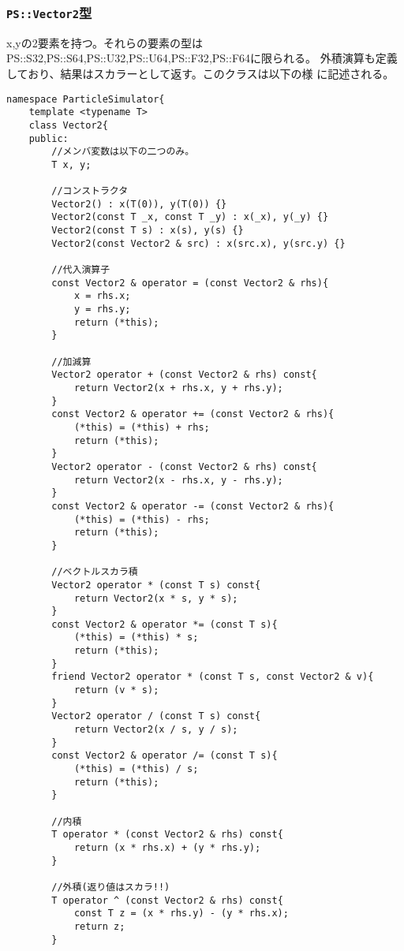 \subsubsection{{\tt PS::Vector2}型} 

x,yの2要素を持つ。それらの要素の型は
{PS::S32},{PS::S64},{PS::U32},{PS::U64},{PS::F32},{PS::F64}に限られる。
外積演算も定義しており、結果はスカラーとして返す。このクラスは以下の様
に記述される。

\begin{lstlisting}[caption=Vector2]
namespace ParticleSimulator{
    template <typename T>
    class Vector2{
    public:
        //メンバ変数は以下の二つのみ。
        T x, y;

        //コンストラクタ
        Vector2() : x(T(0)), y(T(0)) {}
        Vector2(const T _x, const T _y) : x(_x), y(_y) {}
        Vector2(const T s) : x(s), y(s) {}
        Vector2(const Vector2 & src) : x(src.x), y(src.y) {}

        //代入演算子
        const Vector2 & operator = (const Vector2 & rhs){
            x = rhs.x;
            y = rhs.y;
            return (*this);
        }

        //加減算
        Vector2 operator + (const Vector2 & rhs) const{
            return Vector2(x + rhs.x, y + rhs.y);
        }
        const Vector2 & operator += (const Vector2 & rhs){
            (*this) = (*this) + rhs;
            return (*this);
        }
        Vector2 operator - (const Vector2 & rhs) const{
            return Vector2(x - rhs.x, y - rhs.y);
        }
        const Vector2 & operator -= (const Vector2 & rhs){
            (*this) = (*this) - rhs;
            return (*this);
        }

        //ベクトルスカラ積
        Vector2 operator * (const T s) const{
            return Vector2(x * s, y * s);
        }
        const Vector2 & operator *= (const T s){
            (*this) = (*this) * s;
            return (*this);
        }
        friend Vector2 operator * (const T s, const Vector2 & v){
            return (v * s);
        }
        Vector2 operator / (const T s) const{
            return Vector2(x / s, y / s);
        }
        const Vector2 & operator /= (const T s){
            (*this) = (*this) / s;
            return (*this);
        }

        //内積
        T operator * (const Vector2 & rhs) const{
            return (x * rhs.x) + (y * rhs.y);
        }

        //外積(返り値はスカラ!!)
        T operator ^ (const Vector2 & rhs) const{
            const T z = (x * rhs.y) - (y * rhs.x);
            return z;
        }


\end{lstlisting}
